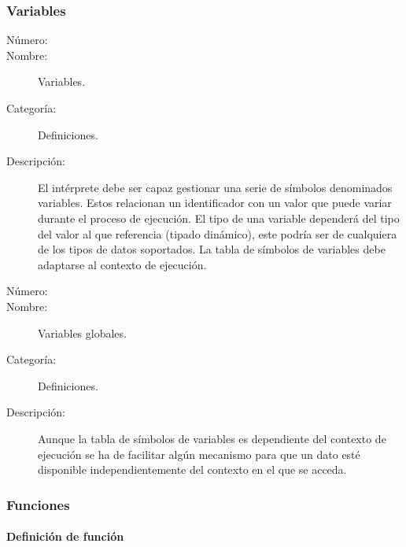 \subsubsection{Variables}
	\begin{description}
		\item [Número:] \cn
		\item [Nombre:] Variables.
		\item [Categoría:] Definiciones.
		\item [Descripción:] El intérprete debe ser capaz gestionar una serie de símbolos
		denominados variables. Estos relacionan un identificador con un valor que puede variar durante el proceso de ejecución. El tipo
		de una variable dependerá del tipo del valor al que referencia (tipado dinámico), este podría ser de cualquiera de los tipos de
		datos soportados. La tabla de símbolos de variables debe adaptarse al contexto de ejecución.
	\end {description}

	\begin{description}
		\item [Número:] \cn
		\item [Nombre:] Variables globales.
		\item [Categoría:] Definiciones.
		\item [Descripción:] Aunque la tabla de símbolos de variables es dependiente del contexto de ejecución se
		ha de facilitar algún mecanismo para que un dato esté disponible independientemente del contexto en el que
		se acceda.
	\end {description}

\subsubsection{Funciones}

\paragraph{Definición de función}

